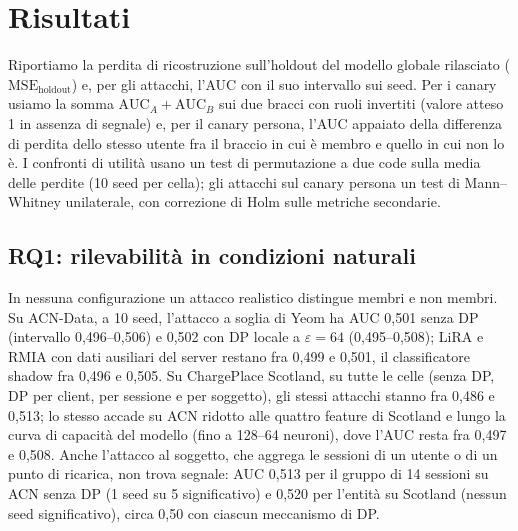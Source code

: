 
\section{Risultati}
\label{sec:results}

Riportiamo la perdita di ricostruzione sull'holdout del modello globale rilasciato
($\mathrm{MSE}_{\mathrm{holdout}}$) e, per gli attacchi, l'AUC con il suo intervallo sui seed.
Per i canary usiamo la somma $\mathrm{AUC}_A+\mathrm{AUC}_B$ sui due bracci con ruoli
invertiti (valore atteso 1 in assenza di segnale) e, per il canary persona, l'AUC appaiato
della differenza di perdita dello stesso utente fra il braccio in cui è membro e quello in cui
non lo è. I confronti di utilità usano un test di permutazione a due code sulla media delle
perdite (10 seed per cella); gli attacchi sul canary persona un test di Mann--Whitney
unilaterale, con correzione di Holm sulle metriche secondarie.

\subsection{RQ1: rilevabilità in condizioni naturali}
\label{subsec:res_naturale}

In nessuna configurazione un attacco realistico distingue membri e non membri. Su ACN-Data,
a 10 seed, l'attacco a soglia di Yeom ha AUC 0,501 senza DP (intervallo 0,496--0,506) e 0,502
con DP locale a $\varepsilon=64$ (0,495--0,508); LiRA e RMIA con dati ausiliari del server
restano fra 0,499 e 0,501, il classificatore shadow fra 0,496 e 0,505. Su ChargePlace Scotland,
su tutte le celle (senza DP, DP per client, per sessione e per soggetto), gli stessi attacchi
stanno fra 0,486 e 0,513; lo stesso accade su ACN ridotto alle quattro feature di Scotland e
lungo la curva di capacità del modello (fino a 128--64 neuroni), dove l'AUC resta fra 0,497 e
0,508. Anche l'attacco al soggetto, che aggrega le sessioni di un utente o di un punto di
ricarica, non trova segnale: AUC 0,513 per il gruppo di 14 sessioni su ACN senza DP (1 seed su 5
significativo) e 0,520 per l'entità su Scotland (nessun seed significativo), circa 0,50 con
ciascun meccanismo di DP.

